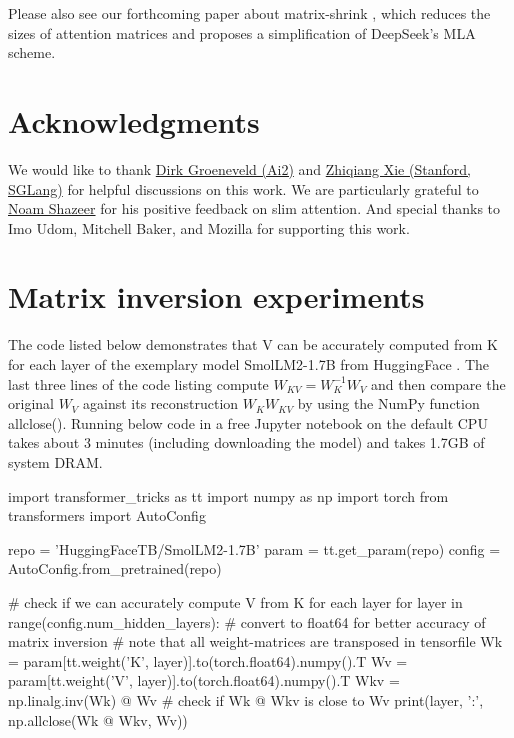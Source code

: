 \documentclass{article}
\begin{document}
Please also see our forthcoming paper about matrix-shrink \citep{matShrink}, which reduces the sizes of attention matrices and proposes a simplification of DeepSeek's MLA scheme.

\section*{Acknowledgments}
We would like to thank \href{https://scholar.google.com/citations?user=KEhvGNMAAAAJ&hl=en}{Dirk Groeneveld (Ai2)} and \href{https://scholar.google.com/citations?user=Be2fl8sAAAAJ&hl=en}{Zhiqiang Xie (Stanford, SGLang)} for helpful discussions on this work. We are particularly grateful to \href{https://scholar.google.com/citations?user=wsGvgA8AAAAJ&hl=en}{Noam Shazeer} for his positive feedback on slim attention. And special thanks to Imo Udom, Mitchell Baker, and Mozilla for supporting this work.

\appendix

\section{Matrix inversion experiments}
The code listed below demonstrates that V can be accurately computed from K for each layer of the exemplary model SmolLM2-1.7B from HuggingFace \citep{smollm}. The last three lines of the code listing compute $W_{KV} = W_K^{-1} W_V$ and then compare the original $W_V$ against its reconstruction $W_K W_{KV}$ by using the NumPy function allclose(). Running below code in a free Jupyter notebook on the default CPU takes about 3 minutes (including downloading the model) and takes 1.7GB of system DRAM.

\begin{python}
import transformer_tricks as tt
import numpy as np
import torch
from transformers import AutoConfig

repo = 'HuggingFaceTB/SmolLM2-1.7B'
param = tt.get_param(repo)
config = AutoConfig.from_pretrained(repo)

# check if we can accurately compute V from K for each layer
for layer in range(config.num_hidden_layers):
  # convert to float64 for better accuracy of matrix inversion
  # note that all weight-matrices are transposed in tensorfile
  Wk = param[tt.weight('K', layer)].to(torch.float64).numpy().T
  Wv = param[tt.weight('V', layer)].to(torch.float64).numpy().T
  Wkv = np.linalg.inv(Wk) @ Wv
  # check if Wk @ Wkv is close to Wv
  print(layer, ':', np.allclose(Wk @ Wkv, Wv))
\end{python}
\end{document}
